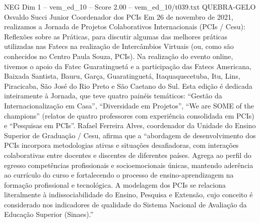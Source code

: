 \begin{textsample}{NEG Dim 1 – vem\_ed\_10 – Score 2.00 – vem\_ed\_10/t039.txt}  \label{ex:f1_neg_068}
QUEBRA-GELO Osvaldo Succi Junior Coordenador dos PCIs Em 26 de novembro de 2021, realizamos a Jornada de Projetos Colaborativos Internacionais (PCIs / Cesu): Reflexões sobre as Práticas, para discutir algumas das melhores práticas utilizadas nas Fatecs na realização de Intercâmbios Virtuais (ou, como são conhecidos no Centro Paula Souza, PCIs).
Na realização do evento online, tivemos o apoio da Fatec Guaratinguetá e a participação das Fatecs Americana, Baixada Santista, Bauru, Garça, Guaratinguetá, Itaquaquecetuba, Itu, Lins, Piracicaba, São José do Rio Preto e São Caetano do Sul.
Esta edição é dedicada inteiramente à Jornada, que teve quatro painéis temáticos: “Gestão da Internacionalização em Casa”, “Diversidade em Projetos”, “We are SOME of the champions” (relatos de quatro professores com experiência consolidada em PCIs) e “Pesquisas em PCIs”.
Rafael Ferreira Alves, coordenador da Unidade do Ensino Superior de Graduação / Cesu, afirma que a “abordagem de desenvolvimento dos PCIs incorpora metodologias ativas e situações desafiadoras, com interações colaborativas entre docentes e discentes de diferentes países.
Agrega ao perfil do egresso competências profissionais e socioemocionais únicas, mantendo aderência ao currículo do curso e fortalecendo o processo de ensino-aprendizagem na formação profissional e tecnológica.
A modelagem dos PCIs se relaciona literalmente à indissociabilidade do Ensino, Pesquisa e Extensão, cujo conceito é considerado nos indicadores de qualidade do Sistema Nacional de Avaliação da Educação Superior (Sinaes).”

\end{textsample}
